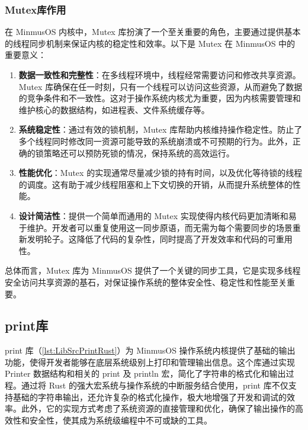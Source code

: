 \subsubsection{Mutex库作用}

在 MinmusOS 内核中，Mutex 库扮演了一个至关重要的角色，主要通过提供基本的线程同步机制来保证内核的稳定性和效率。以下是 Mutex 在 MinmusOS 中的重要意义：

\begin{enumerate}
    \item \textbf{数据一致性和完整性}：在多线程环境中，线程经常需要访问和修改共享资源。Mutex 库确保在任一时刻，只有一个线程可以访问这些资源，从而避免了数据的竞争条件和不一致性。这对于操作系统内核尤为重要，因为内核需要管理和维护核心的数据结构，如进程表、文件系统缓存等。
    \item \textbf{系统稳定性}：通过有效的锁机制，Mutex 库帮助内核维持操作稳定性。防止了多个线程同时修改同一资源可能导致的系统崩溃或不可预期的行为。此外，正确的锁策略还可以预防死锁的情况，保持系统的高效运行。
    \item \textbf{性能优化}：Mutex 的实现通常尽量减少锁的持有时间，以及优化等待锁的线程的调度。这有助于减少线程阻塞和上下文切换的开销，从而提升系统整体的性能。
    \item \textbf{设计简洁性}：提供一个简单而通用的 Mutex 实现使得内核代码更加清晰和易于维护。开发者可以重复使用这一同步原语，而无需为每个需要同步的场景重新发明轮子。这降低了代码的复杂性，同时提高了开发效率和代码的可重用性。
\end{enumerate}

总体而言，Mutex 库为 MinmusOS 提供了一个关键的同步工具，它是实现多线程安全访问共享资源的基石，对保证操作系统的整体安全性、稳定性和性能至关重要。

\subsection{print库}

print 库（\cref{lst:LibSrcPrintRust}）为 MinmusOS 操作系统内核提供了基础的输出功能，使得开发者能够在底层系统级别上打印和管理输出信息。这个库通过实现 Printer 数据结构和相关的 print 及 println 宏，简化了字符串的格式化和输出过程。通过将 Rust 的强大宏系统与操作系统的中断服务结合使用，print 库不仅支持基础的字符串输出，还允许复杂的格式化操作，极大地增强了开发和调试的效率。此外，它的实现方式考虑了系统资源的直接管理和优化，确保了输出操作的高效性和安全性，使其成为系统级编程中不可或缺的工具。

